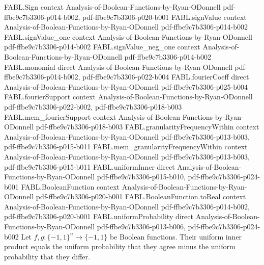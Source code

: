 \begin{theorem}
\label{FABL.uniformInner_eq_uniformProbability_eq_sub_ne}
\leanok
{}
\proofstep
  {FABL.Sign}
  {context}
  {Analysis-of-Boolean-Functions-by-Ryan-ODonnell}
  {pdf-ffbe9c7b3306-p014-b002,
    pdf-ffbe9c7b3306-p020-b001}
\proofstep
  {FABL.signValue}
  {context}
  {Analysis-of-Boolean-Functions-by-Ryan-ODonnell}
  {pdf-ffbe9c7b3306-p014-b002}
\proofstep
  {FABL.signValue_one}
  {context}
  {Analysis-of-Boolean-Functions-by-Ryan-ODonnell}
  {pdf-ffbe9c7b3306-p014-b002}
\proofstep
  {FABL.signValue_neg_one}
  {context}
  {Analysis-of-Boolean-Functions-by-Ryan-ODonnell}
  {pdf-ffbe9c7b3306-p014-b002}
\proofstep
  {FABL.monomial}
  {direct}
  {Analysis-of-Boolean-Functions-by-Ryan-ODonnell}
  {pdf-ffbe9c7b3306-p014-b002,
    pdf-ffbe9c7b3306-p022-b004}
\proofstep
  {FABL.fourierCoeff}
  {direct}
  {Analysis-of-Boolean-Functions-by-Ryan-ODonnell}
  {pdf-ffbe9c7b3306-p025-b004}
\proofstep
  {FABL.fourierSupport}
  {context}
  {Analysis-of-Boolean-Functions-by-Ryan-ODonnell}
  {pdf-ffbe9c7b3306-p022-b002,
    pdf-ffbe9c7b3306-p018-b003}
\proofstep
  {FABL.mem_fourierSupport}
  {context}
  {Analysis-of-Boolean-Functions-by-Ryan-ODonnell}
  {pdf-ffbe9c7b3306-p018-b003}
\proofstep
  {FABL.granularityFrequencyWithin}
  {context}
  {Analysis-of-Boolean-Functions-by-Ryan-ODonnell}
  {pdf-ffbe9c7b3306-p013-b003,
    pdf-ffbe9c7b3306-p015-b011}
\proofstep
  {FABL.mem_granularityFrequencyWithin}
  {context}
  {Analysis-of-Boolean-Functions-by-Ryan-ODonnell}
  {pdf-ffbe9c7b3306-p013-b003,
    pdf-ffbe9c7b3306-p015-b011}
\proofstep
  {FABL.uniformInner}
  {direct}
  {Analysis-of-Boolean-Functions-by-Ryan-ODonnell}
  {pdf-ffbe9c7b3306-p015-b010,
    pdf-ffbe9c7b3306-p024-b001}
\proofstep
  {FABL.BooleanFunction}
  {context}
  {Analysis-of-Boolean-Functions-by-Ryan-ODonnell}
  {pdf-ffbe9c7b3306-p020-b001}
\proofstep
  {FABL.BooleanFunction.toReal}
  {context}
  {Analysis-of-Boolean-Functions-by-Ryan-ODonnell}
  {pdf-ffbe9c7b3306-p014-b002,
    pdf-ffbe9c7b3306-p020-b001}
\proofstep
  {FABL.uniformProbability}
  {direct}
  {Analysis-of-Boolean-Functions-by-Ryan-ODonnell}
  {pdf-ffbe9c7b3306-p013-b006,
    pdf-ffbe9c7b3306-p024-b002}
Let $f,g:\{−1,1\}^n\to\{−1,1\}$ be Boolean functions. Their uniform inner product equals
the uniform probability that they agree minus the uniform probability that they differ.
\end{theorem}

